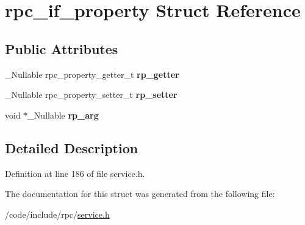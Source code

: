 \hypertarget{structrpc__if__property}{}\section{rpc\+\_\+if\+\_\+property Struct Reference}
\label{structrpc__if__property}
\subsection*{Public Attributes}
\begin{DoxyCompactItemize}
\item 
\mbox{\label{structrpc__if__property_a2b294c7fed3665f1a58020040ec13aee}} 
\+\_\+\+Nullable rpc\+\_\+property\+\_\+getter\+\_\+t {\bfseries rp\+\_\+getter}
\item 
\mbox{\label{structrpc__if__property_a02e1f9e6e5680714278ed6dd67987d67}} 
\+\_\+\+Nullable rpc\+\_\+property\+\_\+setter\+\_\+t {\bfseries rp\+\_\+setter}
\item 
\mbox{\label{structrpc__if__property_a81d2953a7a4bdff1775330c29992546b}} 
void $\ast$\+\_\+\+Nullable {\bfseries rp\+\_\+arg}
\end{DoxyCompactItemize}


\subsection{Detailed Description}


Definition at line 186 of file service.\+h.



The documentation for this struct was generated from the following file\+:\begin{DoxyCompactItemize}
\item 
/code/include/rpc/\hyperlink{service_8h}{service.\+h}\end{DoxyCompactItemize}
